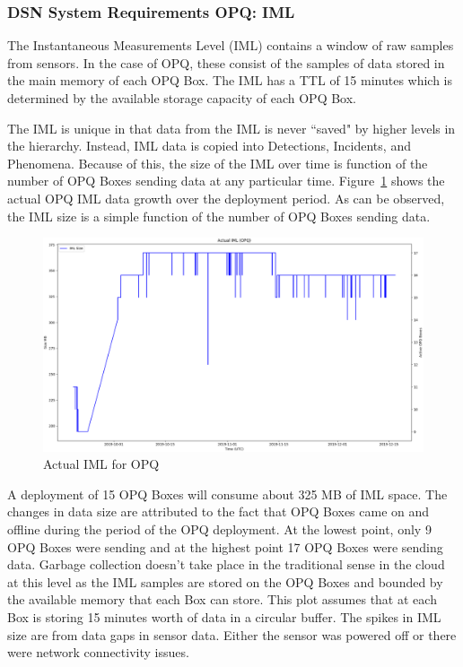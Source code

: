 \subsubsection{DSN System Requirements OPQ: IML}

The Instantaneous Measurements Level (IML) contains a window of raw samples from sensors. In the case of OPQ, these consist of the samples of data stored in the main memory of each OPQ Box. The IML has a TTL of 15 minutes which is determined by the available storage capacity of each OPQ Box.

The IML is unique in that data from the IML is never ``saved" by higher levels in the hierarchy. Instead, IML data is copied into Detections, Incidents, and Phenomena. Because of this, the size of the IML over time is function of the number of OPQ Boxes sending data at any particular time. Figure~\ref{fig:actual_iml_opq} shows the actual OPQ IML data growth over the deployment period. As can be observed, the IML size is a simple function of the number of OPQ Boxes sending data.

\begin{figure}[H]
    \centering
    \includegraphics[width=\linewidth]{figures/actual_iml_opq.png}
    \caption{Actual IML for OPQ}
    \label{fig:actual_iml_opq}
\end{figure}

A deployment of 15 OPQ Boxes will consume about 325 MB of IML space. The changes in data size are attributed to the fact that OPQ Boxes came on and offline during the period of the OPQ deployment. At the lowest point, only 9 OPQ Boxes were sending and at the highest point 17 OPQ Boxes were sending data. Garbage collection doesn't take place in the traditional sense in the cloud at this level as the IML samples are stored on the OPQ Boxes and bounded by the available memory that each Box can store. This plot assumes that at each Box is storing 15 minutes worth of data in a circular buffer. The spikes in IML size are from data gaps in sensor data. Either the sensor was powered off or there were network connectivity issues.

